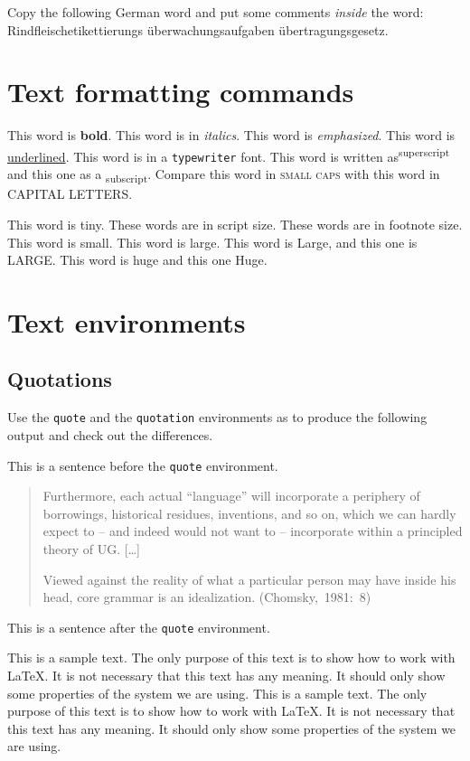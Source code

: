 \documentclass[10pt, paper=a4, abstracton]{scrartcl}
\begin{document}
Copy the following German word and put some comments \textit{inside} the word:
Rindfleischetikettierungs%
überwachungsaufgaben%
übertragungsgesetz. 


\section{Text formatting commands}


This word is \textbf{bold}. This word is in \textit{italics}. This word is \emph{emphasized}. This word is \underline{underlined}. This word is in a \texttt{typewriter} font. This word is written as\textsuperscript{superscript} and this one as a \textsubscript{subscript}. Compare this word in \textsc{small caps} with this word in CAPITAL LETTERS. 

This word is {\tiny tiny}. These words are in {\scriptsize script size}. These words are in {\footnotesize footnote size}. This word is {\small small}. This word is {\large large}. This word is {\Large Large}, and this one is {\LARGE LARGE}. This word is {\huge huge} and this one {\Huge Huge}.


\section{Text environments}


\subsection{Quotations}

Use the \texttt{quote} and the \texttt{quotation} environments as to produce the following output and check out the differences.


This is a sentence before the \texttt{quote} environment.
\begin{quote}
	Furthermore, each actual ``language'' will incorporate a periphery of borrowings,
	historical residues, inventions, and so on, which we can hardly expect to -- and
	indeed would not want to -- incorporate within a principled theory of UG. [\dots]
	
	Viewed against the reality of what a particular person may have inside
	his head, core grammar is an idealization.
	\hfill (Chomsky,~1981:~8)
\end{quote}
This is a sentence after the \texttt{quote} environment.


This is a sample text. The only purpose of this text is to show how to work with \LaTeX . It is not necessary that this text has any meaning. It should only show some properties of the system we are using. This is a sample text. The only purpose of this text is to show how to work with \LaTeX . It is not necessary that this text has any meaning. It should only show some properties of the system we are using. 
\end{document}
